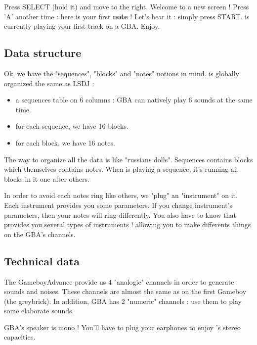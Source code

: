 \documentclass[12pt,a4paper]{article}
\begin{document}

    Press SELECT (hold it) and move to the right. Welcome to a new screen !
    Press 'A' another time : here is your first {\bf note} !
    Let's hear it : simply press START. \FAT is currently playing your first track on a GBA. Enjoy.


    \subsection{Data structure}

    Ok, we have the "sequences", "blocks" and "notes" notions in mind. \FAT is globally organized the same as LSDJ :
    \begin{itemize}
        \item{a sequences table on 6 columns : GBA can natively play 6 sounds at the same time.}
        \item{for each sequence, we have 16 blocks.}
        \item{for each block, we have 16 notes.}
    \end{itemize}\medskip

    The way to organize all the data is like "russians dolls". Sequences contains blocks which themselves contains notes.
    When \FAT is playing a sequence, it's running all blocks in it one after others.

    In order to avoid each notes ring like others, we "plug" an "instrument" on it.
    Each instrument provides you some parameters.
    If you change instrument's parameters, then your notes will ring differently.
    You also have to know that \FAT provides you several types of instruments ! allowing you to make differents things on the GBA's channels.

    \subsection{Technical data}

    The GameboyAdvance provide us 4 "analogic" channels in order to generate sounds and noises.
    These channels are almost the same as on the first Gameboy (the greybrick).
    In addition, GBA has 2 "numeric" channels : use them to play some elaborate sounds.

    GBA's speaker is mono ! You'll have to plug your earphones to enjoy \FAT's stereo capacities.
\end{document}
